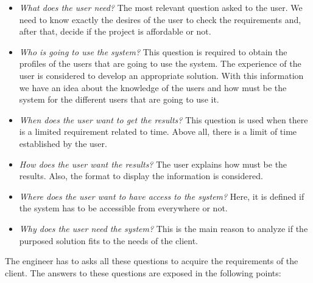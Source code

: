 \begin{itemize}

\item \textit{What does the user need?} The most relevant question asked to the user. We need to know exactly the desires of the user to check the requirements and, after that, decide if the project is affordable or not.

\item \textit{Who is going to use the system?} This question is required to obtain the profiles of the users that are going to use the system. The experience of the user is considered to develop an appropriate solution. With this information we have an idea about the knowledge of the users and how must be the system for the different users that are going to use it.

\item \textit{When does the user want to get the results?} This question is used when there is a limited requirement related to time. Above all, there is a limit of time established by the user.

\item \textit{How does the user want the results?} The user explains how must be the results. Also, the format to display the information is considered.

\item \textit{Where does the user want to have access to the system?} Here, it is defined if the system has to be accessible from everywhere or not.

\item \textit{Why does the user need the system?} This is the main reason to analyze if the purposed solution fits to the needs of the client.

\end{itemize}

The engineer has to asks all these questions to acquire the requirements of the client. The answers to these questions are exposed in the following points:

